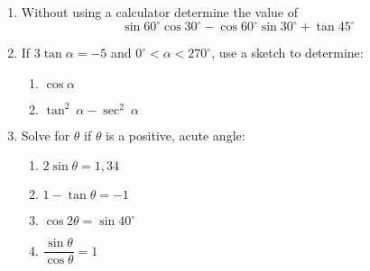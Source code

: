\begin{eocexercises}{}

\begin{enumerate}[itemsep=6pt, label=\textbf{\arabic*}. ] 
\item Without using a calculator determine the value of 
\begin{equation*}
\sin 60^{\circ} \cos 30^{\circ}-\cos 60^{\circ}\sin 30^{\circ} + \tan 45^{\circ}
\end{equation*}
\item If $3 \tan \alpha = -5$ and $0^{\circ} < \alpha < 270^{\circ}$, use a sketch to determine:
    \begin{enumerate}[noitemsep, label=\textbf{(\alph*)} ]
    \item $\cos \alpha$
    \item $\tan^{2}~\alpha - \sec^{2}~\alpha$
    \end{enumerate}
\item Solve for $\theta$ if $\theta$ is a positive, acute angle:
    \begin{enumerate}[noitemsep, label=\textbf{(\alph*)} ]
    \item $2 \sin \theta = 1,34$
    \item $1 - \tan \theta = -1$
    \item $\cos 2\theta = \sin 40^{\circ}$ 
    \item $\dfrac{\sin \theta}{\cos \theta}= 1$
    \end{enumerate}



\end{enumerate}
\end{eocexercises}
